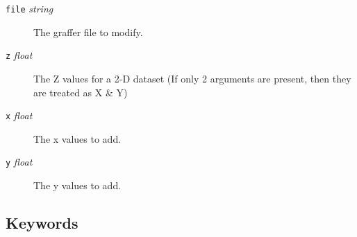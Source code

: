 \documentclass[11pt,twoside,english]{article}
\begin{document}
\begin{description}
\item[\texttt{file} \textit{string}] The graffer file to modify.
\item[\texttt{z} \textit{float}] The Z values for a 2-D dataset (If
  only 2 arguments are present, then they are treated as X \& Y)
\item[\texttt{x} \textit{float}] The x values to add.
\item[\texttt{y} \textit{float}] The y values to add.
\end{description}



\subsection{Keywords}
\end{document}
